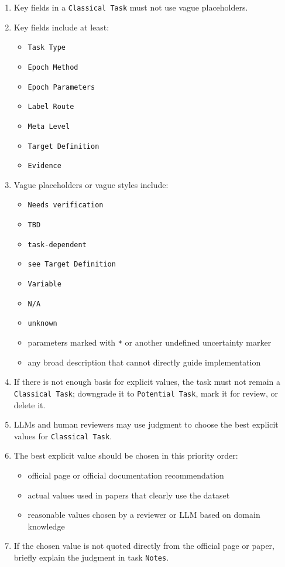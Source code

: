\begin{tcolorbox}
\begin{enumerate}[leftmargin=1.5em,noitemsep,topsep=2pt]
\item Key fields in a \texttt{Classical Task} must not use vague placeholders.
\item Key fields include at least:
\begin{itemize}[leftmargin=1.2em,noitemsep,topsep=1pt]
\item \texttt{Task Type}
\item \texttt{Epoch Method}
\item \texttt{Epoch Parameters}
\item \texttt{Label Route}
\item \texttt{Meta Level}
\item \texttt{Target Definition}
\item \texttt{Evidence}
\end{itemize}
\item Vague placeholders or vague styles include:
\begin{itemize}[leftmargin=1.2em,noitemsep,topsep=1pt]
\item \texttt{Needs verification}
\item \texttt{TBD}
\item \texttt{task-dependent}
\item \texttt{see Target Definition}
\item \texttt{Variable}
\item \texttt{N/A}
\item \texttt{unknown}
\item parameters marked with \texttt{*} or another undefined uncertainty marker
\item any broad description that cannot directly guide implementation
\end{itemize}
\item If there is not enough basis for explicit values, the task must not remain a \texttt{Classical Task}; downgrade it to \texttt{Potential Task}, mark it for review, or delete it.
\item LLMs and human reviewers may use judgment to choose the best explicit values for \texttt{Classical Task}.
\item The best explicit value should be chosen in this priority order:
\begin{itemize}[leftmargin=1.2em,noitemsep,topsep=1pt]
\item official page or official documentation recommendation
\item actual values used in papers that clearly use the dataset
\item reasonable values chosen by a reviewer or LLM based on domain knowledge
\end{itemize}
\item If the chosen value is not quoted directly from the official page or paper, briefly explain the judgment in task \texttt{Notes}.
\end{enumerate}


\end{tcolorbox}
